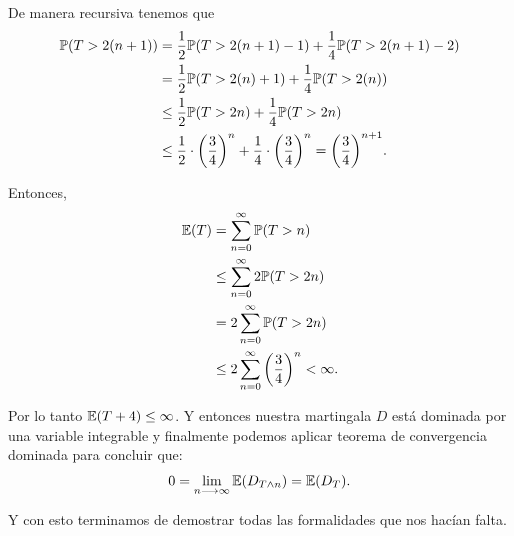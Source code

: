 	De manera recursiva tenemos que
	\begin{align}
		\mathbb{P}(T > 2(n+1)) &=     \frac{1}{2} \mathbb{P}(T > 2(n+1) - 1) + \frac{1}{4} \mathbb{P}(T > 2(n+1) - 2) \\
						&=     \frac{1}{2} \mathbb{P}(T > 2(n) + 1) + \frac{1}{4} \mathbb{P}(T > 2(n)) \\
					   &\leq  \frac{1}{2} \mathbb{P}(T > 2n) + \frac{1}{4} \mathbb{P}(T > 2n) \\
					   &\leq  \frac{1}{2} \cdot \bigg(\frac{3}{4}\bigg)^{n} + \frac{1}{4} \cdot \bigg(\frac{3}{4}\bigg)^{n} = 		
					   \bigg(\frac{3}{4}\bigg)^{n+1}.
	\end{align}
	
	Entonces,
	\begin{align}
		\mathbb{E}(T) 	&= 		\sum_{n=0}^\infty \mathbb{P}(T > n) \\
				&\leq 	\sum_{n=0}^\infty 2\mathbb{P}(T > 2n) \\
				&= 		2 \sum_{n=0}^\infty \mathbb{P}(T > 2n) \\
				&\leq 	2 \sum_{n=0}^\infty \bigg(\frac{3}{4}\bigg)^{n} < \infty.
	\end{align}
	
	Por lo tanto $\mathbb{E}(T + 4) \leq \infty$. Y entonces nuestra martingala $D$ está dominada por una variable integrable y finalmente
	podemos aplicar teorema de convergencia dominada para concluir que:
	\begin{align}
		0 = \lim_{n \longrightarrow \infty} \mathbb{E}(D_{T \wedge n}) = \mathbb{E}(D_T).
	\end{align}
	
	Y con esto terminamos de demostrar todas las formalidades que nos hacían falta.